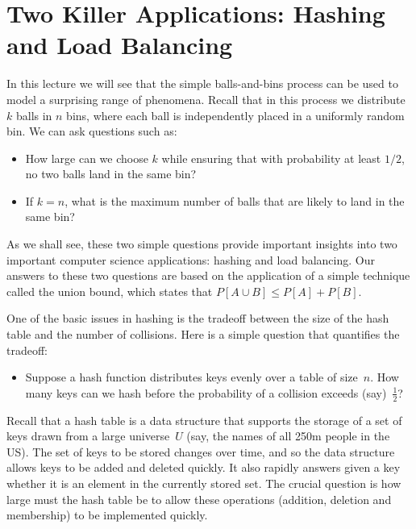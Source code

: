 \documentclass[11pt]{article}
\begin{document}
\maketitle

\section*{Two Killer Applications: Hashing and Load Balancing}

In this lecture we will see that the simple balls-and-bins process can
be used to model a surprising range of phenomena. Recall that in 
this process we distribute $k$ balls in $n$ bins, where each
ball is independently placed in a uniformly random bin. We can 
ask questions such as:
\begin{itemize}
\item How large can we choose $k$ while ensuring that with probability at least 
$1/2$, no two balls land in the same bin?
\item If $k = n$, what is the maximum number of balls that are likely to land in 
the same bin?
\end{itemize}

As we shall see, these two simple questions provide important insights into two 
important computer science applications: hashing and load balancing. 
Our answers to these two questions are based on the application of a simple 
technique called the union bound, which states that $P[A \cup B] \leq P[A] + P[B]$. 

One of the basic issues in hashing is the tradeoff between the size of the hash table
and the number of collisions. Here is a simple question that quantifies the tradeoff:

\begin{itemize}
\item Suppose a hash function distributes keys evenly over
a table of size~$n$.  How many keys can
we hash before the probability of a collision exceeds (say)~$\frac{1}{2}$?
\end{itemize}

Recall that a hash table is a data structure that supports
the storage of a set of keys drawn from a large universe~$U$
(say, the names of all 250m people in the US). The set of keys 
to be stored changes over time, and so the data structure 
allows keys to be added and deleted quickly. It also rapidly
answers given a key whether it is an element in the currently
stored set. The crucial question is how large must the hash 
table be to allow these operations (addition, deletion and 
membership) to be implemented quickly. 
\end{document}
